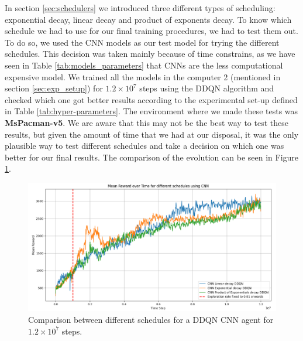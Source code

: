 In section \ref{sec:schedulers} we introduced three different types of scheduling: exponential decay, linear decay and product of exponents decay. To know which schedule we had to use for our final training procedures, we had to test them out. To do so, we used the CNN models as our test model for trying the different schedules. This decision was taken mainly because of time constrains, as we have seen in Table  \ref{tab:models_parameters} that CNNs are the less computational expensive model. We trained all the models in the computer 2 (mentioned in section \ref{sec:exp_setup}) for $1.2 \times 10^7$ steps using the DDQN algorithm and checked which one got better results according to the experimental set-up defined in Table \ref{tab:hyper-parameters}. The environment where we made these tests was \textbf{MsPacman-v5}. We are aware that this may not be the best way to test these results, but given the amount of time that we had at our disposal, it was the only plausible way to test different schedules and take a decision on which one was better for our final results. The comparison of the evolution can be seen in Figure \ref{fig:comp_cnn_schedulers}.

\begin{figure}[!h]
	\centering
	\includegraphics[width=\linewidth]{figures/comp_sch_12M}
	\caption{Comparison between different schedules for a DDQN CNN agent for $1.2 \times10^7$ steps.}
	\label{fig:comp_cnn_schedulers}
\end{figure}

